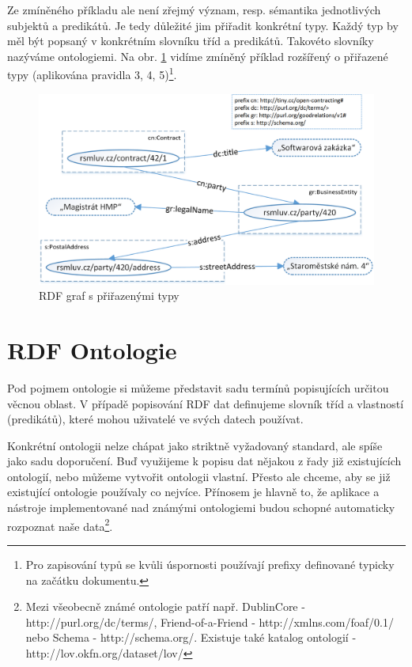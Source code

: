 Ze zmíněného příkladu ale není zřejmý význam, resp. sémantika jednotlivých subjektů a predikátů. Je tedy důležité jim přiřadit konkrétní typy. Každý typ by měl být popsaný v konkrétním slovníku tříd a predikátů. Takovéto slovníky nazýváme ontologiemi. Na obr. \ref{obr:rdf_graphWithOntology} vidíme zmíněný příklad rozšířený o přiřazené typy (aplikována pravidla 3, 4, 5)\footnote{Pro zapisování typů se kvůli úspornosti používají prefixy definované typicky na začátku dokumentu.}.

\begin{figure}[h]
\centerline{\includegraphics[width=\textwidth]{img/rdf_graphWithOntology.eps}}
\caption{RDF graf s přiřazenými typy}
\label{obr:rdf_graphWithOntology}
\end{figure}

\section{RDF Ontologie}

Pod pojmem ontologie si můžeme představit sadu termínů popisujících určitou věcnou oblast. V případě popisování RDF dat definujeme slovník tříd a vlastností (predikátů), které mohou uživatelé ve svých datech používat.

Konkrétní ontologii nelze chápat jako striktně vyžadovaný standard, ale spíše jako sadu doporučení. Buď využijeme k popisu dat nějakou z řady již existujících ontologií, nebo můžeme vytvořit ontologii vlastní. Přesto ale chceme, aby se již existující ontologie používaly co nejvíce. Přínosem je hlavně to, že aplikace a nástroje implementované nad známými ontologiemi budou schopné automaticky rozpoznat naše data\footnote{Mezi všeobecně známé ontologie patří např. DublinCore - http://purl.org/dc/terms/, Friend-of-a-Friend - http://xmlns.com/foaf/0.1/ nebo Schema - http://schema.org/. Existuje také katalog ontologií - http://lov.okfn.org/dataset/lov/}. 

